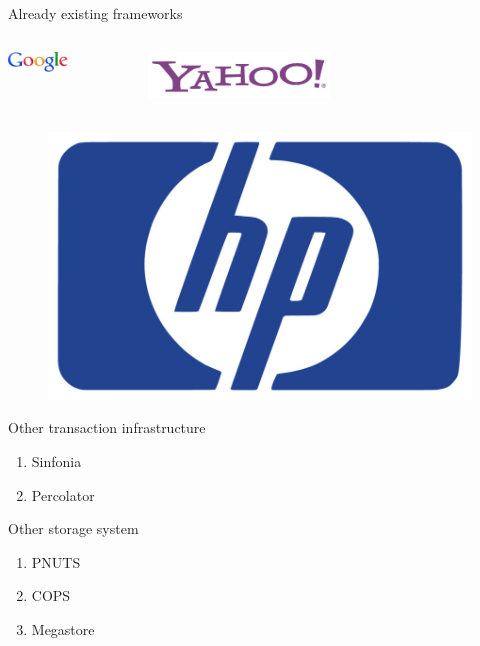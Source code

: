 \documentclass{beamer}
\begin{document}
		\begin{frame}{Already existing frameworks}
	


		
	
	\begin{columns}
	\begin{column}[1]{5cm}
	\includegraphics[width=0.5\textwidth]{img/fig_google.png}
	\end{column}
	\begin{column}[1]{5cm}
	\includegraphics[width=0.5\textwidth]{img/fig_yahoo.png}
	\end{column}
	\end{columns}
		
		
		\begin{figure} [H]
			\centering
			\includegraphics[scale=0.20]{img/fig_hp}
		\end{figure}				

			Other transaction infrastructure					
		
			\begin{enumerate}
			\item Sinfonia
			\item Percolator
			\end{enumerate}						
					
			Other storage system
			\begin{enumerate}
			\item PNUTS
			\item COPS
			\item Megastore
			\end{enumerate}		

		\end{frame}
	
\end{document}
